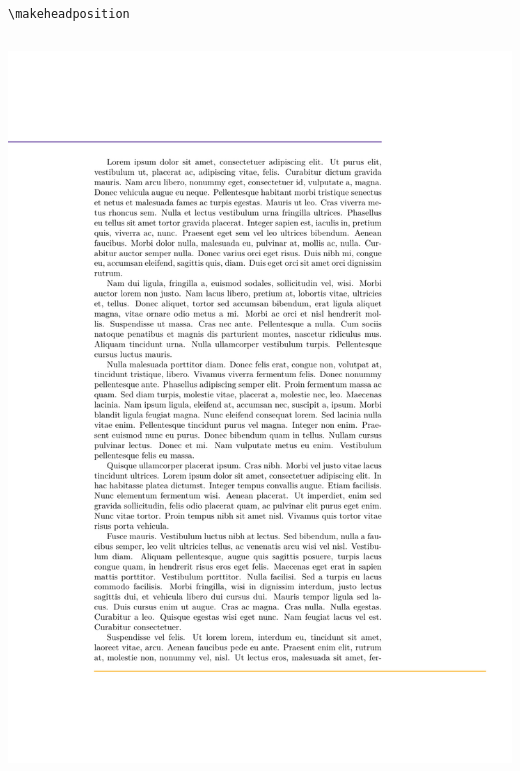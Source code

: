 \documentclass{beamer}
\begin{document}
\begin{frame}[fragile]{\texttt{\textbackslash makeheadposition}}
\begin{columns}
    \begin{column}{0.4\textwidth}
      \begin{overprint}
        \includegraphics[frame,width=\linewidth]{demo-hp-1}

\end{overprint}
\end{column}
\end{columns}
\end{frame}
\end{document}
